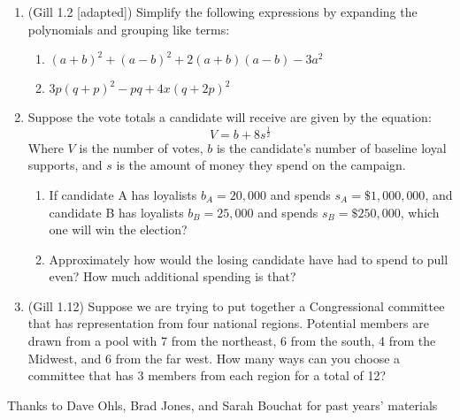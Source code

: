 \documentclass[11pt]{article}
\begin{document}
\begin{enumerate}
\item (Gill 1.2 [adapted]) Simplify the following expressions by expanding the polynomials and grouping like terms:
\begin{enumerate}
  \item $(a+b)^2 + (a-b)^2 + 2(a+b)(a-b) - 3a^2$ %
  \item $3p(q+p)^2 - pq + 4x(q + 2p)^2$ %
\end{enumerate}


\item Suppose the vote totals a candidate will receive are given by the equation:
\begin{equation*}
V = b + 8s^{\frac{1}{2}}
\end{equation*}
Where $V$ is the number of votes, $b$ is the candidate's number of baseline loyal supports, and $s$ is the amount of money they spend on the campaign.
\begin{enumerate}
\item If candidate A has loyalists $b_A = 20,000$ and spends $s_A = \$1,000,000$, and candidate B has loyalists $b_B = 25,000$ and spends $s_B = \$250,000$, which one will win the election? %
\item Approximately how would the losing candidate have had to spend to pull even?  How much additional spending is that? %
\end{enumerate}


\item (Gill 1.12) Suppose we are trying to put together a Congressional committee that has representation from four national regions.  Potential members are drawn from a pool with 7 from the northeast, 6 from the south, 4 from the Midwest, and 6 from the far west.  How many ways can you choose a committee that has 3 members from each region for a total of 12?\\ %





\end{enumerate}

\vfill
\begin{center}
\small{Thanks to Dave Ohls, Brad Jones, and Sarah Bouchat for past years' materials}
\end{center}
\end{document}
